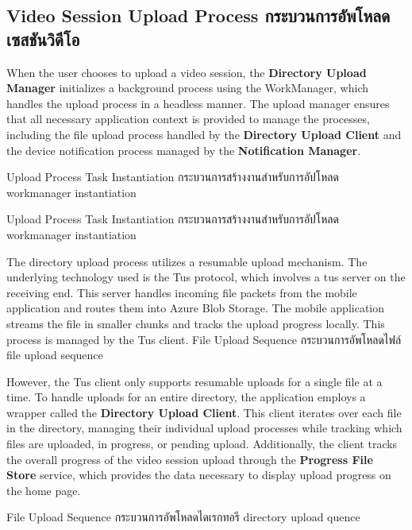 \subsection{\ifenglish Video Session Upload Process \else กระบวนการอัพโหลดเซสชันวิดีโอ \fi}
When the user chooses to upload a video session, the \textbf{Directory Upload Manager} initializes a background process using the WorkManager, which handles the upload process in a headless manner. The upload manager ensures that all necessary application context is provided to manage the processes, including the file upload process handled by the \textbf{Directory Upload Client} and the device notification process managed by the \textbf{Notification Manager}.

{\ifenglish Upload Process Task Instantiation \else กระบวนการสร้างงานสำหรับการอัปโหลด \fi}
{workmanager instantiation}

{\ifenglish Upload Process Task Instantiation \else กระบวนการสร้างงานสำหรับการอัปโหลด \fi}
{workmanager instantiation}

The directory upload process utilizes a resumable upload mechanism. The underlying technology used is the Tus protocol, which involves a tus server on the receiving end. This server handles incoming file packets from the mobile application and routes them into Azure Blob Storage. The mobile application streams the file in smaller chunks and tracks the upload progress locally. This process is managed by the Tus client.
{\ifenglish File Upload Sequence \else กระบวนการอัพโหลดไฟล์ \fi}
{file upload sequence}

However, the Tus client only supports resumable uploads for a single file at a time. To handle uploads for an entire directory, the application employs a wrapper called the \textbf{Directory Upload Client}. This client iterates over each file in the directory, managing their individual upload processes while tracking which files are uploaded, in progress, or pending upload. Additionally, the client tracks the overall progress of the video session upload through the \textbf{Progress File Store} service, which provides the data necessary to display upload progress on the home page.

{\ifenglish File Upload Sequence \else กระบวนการอัพโหลดไดเรกทอรี  \fi}
{directory upload quence}


